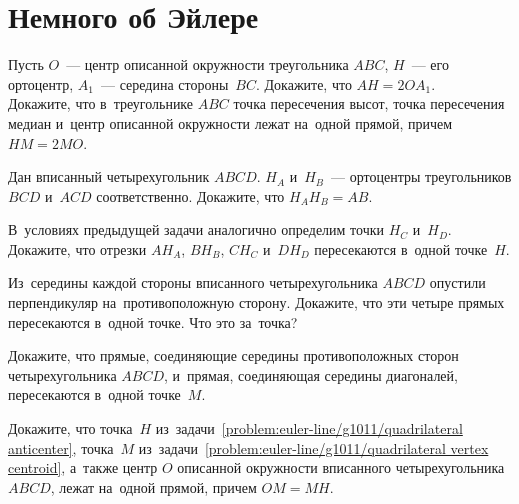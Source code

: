 

\section*{Немного об Эйлере}


\begin{problems}

\item
\sbp
Пусть $O$~--- центр описанной окружности треугольника $ABC$,
$H$~--- его ортоцентр,
$A_1$~--- середина стороны~$BC$.
Докажите, что $AH = 2 O A_1$.
\\
\sbp
Докажите, что в~треугольнике $ABC$ точка пересечения высот, точка пересечения
медиан и~центр описанной окружности лежат на~одной прямой, причем $HM = 2 MO$.

\item
Дан вписанный четырехугольник $ABCD$.
$H_A$ и~$H_B$~--- ортоцентры треугольников $BCD$ и~$ACD$ соответственно.
Докажите, что $H_A H_B = AB$.

\item\label{problem:euler-line/g1011/quadrilateral anticenter}%
В~условиях предыдущей задачи аналогично определим точки $H_C$ и~$H_D$.
Докажите, что отрезки $A H_A$, $B H_B$, $C H_C$ и~$D H_D$ пересекаются
в~одной точке~$H$.

\item
Из~середины каждой стороны вписанного четырехугольника $ABCD$ опустили
перпендикуляр на~противоположную сторону.
Докажите, что эти четыре прямых пересекаются в~одной точке.
Что это за~точка?

\item\label{problem:euler-line/g1011/quadrilateral vertex centroid}%
Докажите, что прямые, соединяющие середины противоположных сторон
четырехугольника $ABCD$, и~прямая, соединяющая середины диагоналей,
пересекаются в~одной точке~$M$.

\item
Докажите, что точка~$H$
из~задачи~\ref{problem:euler-line/g1011/quadrilateral anticenter},
точка~$M$ из~задачи~\ref{problem:euler-line/g1011/quadrilateral vertex centroid},
а~также центр $O$ описанной окружности вписанного четырехугольника $ABCD$,
лежат на~одной прямой, причем $OM = MH$.

\end{problems}

